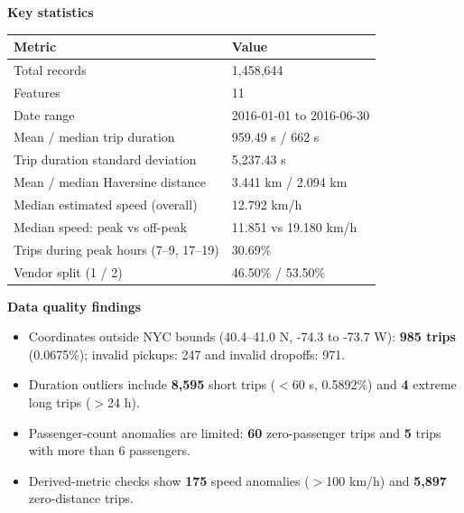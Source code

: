 \documentclass[11pt]{article}
\begin{document}
\begin{center}\textbf{Key statistics}\end{center}\vspace{-10pt}
\begin{table}[H]
    \centering
    \small
    \begin{tabular}{@{}ll@{}}
        \toprule
        Metric                                 & Value                    \\
        \midrule
        Total records                          & 1,458,644                \\
        Features                               & 11                       \\
        Date range                             & 2016-01-01 to 2016-06-30 \\
        Mean / median trip duration            & 959.49 s / 662 s         \\
        Trip duration standard deviation       & 5,237.43 s               \\
        Mean / median Haversine distance       & 3.441 km / 2.094 km      \\
        Median estimated speed (overall)       & 12.792 km/h              \\
        Median speed: peak vs off-peak         & 11.851 vs 19.180 km/h    \\
        Trips during peak hours (7--9, 17--19) & 30.69\%                  \\
        Vendor split (1 / 2)                   & 46.50\% / 53.50\%        \\
        \bottomrule
    \end{tabular}
\end{table}

\textbf{Data quality findings}
\begin{itemize}[leftmargin=1.3em,itemsep=0pt,topsep=0pt]
    \item Coordinates outside NYC bounds (40.4--41.0 N, -74.3 to -73.7 W): \textbf{985 trips} (0.0675\%); invalid pickups: 247 and invalid dropoffs: 971.
    \item Duration outliers include \textbf{8,595} short trips ($<$60 s, 0.5892\%) and \textbf{4} extreme long trips ($>$24 h).
    \item Passenger-count anomalies are limited: \textbf{60} zero-passenger trips and \textbf{5} trips with more than 6 passengers.
    \item Derived-metric checks show \textbf{175} speed anomalies ($>$100 km/h) and \textbf{5,897} zero-distance trips.
\end{itemize}
\end{document}
